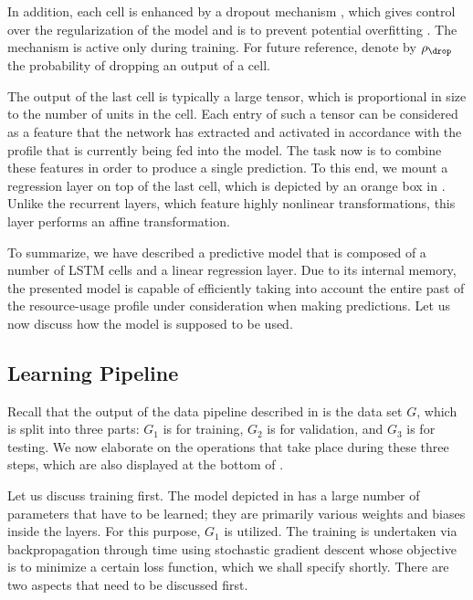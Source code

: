 In addition, each cell is enhanced by a dropout mechanism \cite{zaremba2014},
which gives control over the regularization of the model and is to prevent
potential overfitting \cite{hastie2013}. The mechanism is active only during
training. For future reference, denote by $\rho_\drop$ the probability of
dropping an output of a cell.

The output of the last cell is typically a large tensor, which is proportional
in size to the number of units in the cell. Each entry of such a tensor can be
considered as a feature that the network has extracted and activated in
accordance with the profile that is currently being fed into the model. The task
now is to combine these features in order to produce a single prediction. To
this end, we mount a regression layer on top of the last cell, which is depicted
by an orange box in . Unlike the recurrent layers, which
feature highly nonlinear transformations, this layer performs an affine
transformation.

To summarize, we have described a predictive model that is composed of a number
of \ac{LSTM} cells and a linear regression layer. Due to its internal memory,
the presented model is capable of efficiently taking into account the entire
past of the resource-usage profile under consideration when making predictions.
Let us now discuss how the model is supposed to be used.

\subsection{Learning Pipeline}

Recall that the output of the data pipeline described in  is
the data set $G$, which is split into three parts: $G_1$ is for training, $G_2$
is for validation, and $G_3$ is for testing. We now elaborate on the operations
that take place during these three steps, which are also displayed at the bottom
of .

Let us discuss training first. The model depicted in  has a
large number of parameters that have to be learned; they are primarily various
weights and biases inside the layers. For this purpose, $G_1$ is utilized. The
training is undertaken via backpropagation through time using stochastic
gradient descent \cite{goodfellow2016} whose objective is to minimize a certain
loss function, which we shall specify shortly. There are two aspects that need
to be discussed first.

